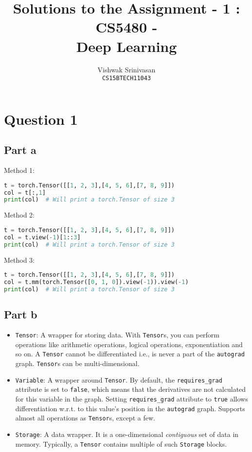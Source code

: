 \documentclass{article}
\title{Solutions to the Assignment - 1 : CS5480 - \\
Deep Learning}
\author{Vishwak Srinivasan\\
\texttt{CS15BTECH11043}}
\date{}
\begin{document}
\maketitle

\section*{Question 1}

\subsection*{Part a}
\begin{flushleft}
Method 1:
\begin{lstlisting}[language=Python]
t = torch.Tensor([[1, 2, 3],[4, 5, 6],[7, 8, 9]])
col = t[:,1]
print(col)  # Will print a torch.Tensor of size 3
\end{lstlisting}

Method 2:
\begin{lstlisting}[language=Python]
t = torch.Tensor([[1, 2, 3],[4, 5, 6],[7, 8, 9]])
col = t.view(-1)[1::3]
print(col)  # Will print a torch.Tensor of size 3
\end{lstlisting}

Method 3:
\begin{lstlisting}[language=Python]
t = torch.Tensor([[1, 2, 3],[4, 5, 6],[7, 8, 9]])
col = t.mm(torch.Tensor([0, 1, 0]).view(-1)).view(-1)
print(col)  # Will print a torch.Tensor of size 3
\end{lstlisting}
\end{flushleft}

\subsection*{Part b}
\begin{flushleft}
\begin{itemize}
\item \texttt{Tensor}: A wrapper for storing data. With \texttt{Tensor}s, you can perform operations like arithmetic operations, logical operations, exponentiation and so on. A \texttt{Tensor} cannot be differentiated i.e., is never a part of the \texttt{autograd} graph. \texttt{Tensor}s can be multi-dimensional.
\item \texttt{Variable}: A wrapper around \texttt{Tensor}. By default, the \texttt{requires\_grad} attribute is set to \texttt{false}, which means that the derivatives are not calculated for this variable in the graph. Setting \texttt{requires\_grad} attribute to \texttt{true} allows differentiation w.r.t. to this value's position in the \texttt{autograd} graph. Supports almost all operations as \texttt{Tensor}s, except a few.
\item \texttt{Storage}: A data wrapper. It is a one-dimensional \emph{contiguous} set of data in memory. Typically, a \texttt{Tensor} contains multiple of such \texttt{Storage} blocks.
\end{itemize}
\end{flushleft}
\end{document}
